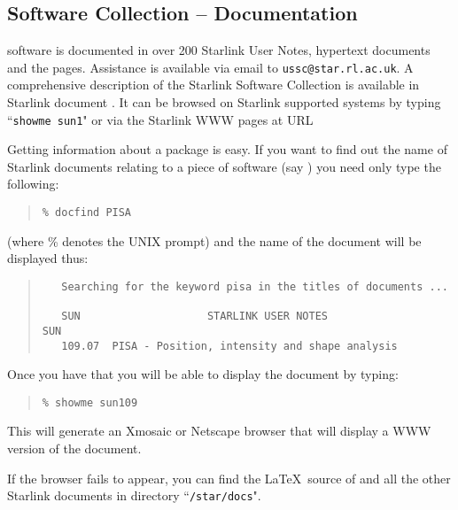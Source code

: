 \subsection{{\STARLINKref} Software Collection -- Documentation} 
\label{sec:ssc}

{\STARLINKref} software is documented in over 200 Starlink User Notes, hypertext
documents and the {\STARLINKWWWref} pages. Assistance is available
via email to {\tt ussc@star.rl.ac.uk}.
A comprehensive description of the Starlink Software 
Collection is available in Starlink document {\SUNONEref}. It can be 
browsed on Starlink supported systems by typing ``{\tt showme sun1}" or via the 
Starlink WWW pages at URL {\HTTPAref}

Getting information about a package is easy. If you want to find out the 
name of Starlink documents relating to a piece of software (say 
{\PISAref}) you need only type the following:

\begin{quote}
\begin{verbatim}
% docfind PISA
\end{verbatim}
\end{quote}

(where \% denotes the UNIX prompt) and the name of the document 
will be displayed thus:

\begin{quote}
\begin{verbatim}
   Searching for the keyword pisa in the titles of documents ...
 
   SUN                    STARLINK USER NOTES                       SUN
   109.07  PISA - Position, intensity and shape analysis
\end{verbatim}
\end{quote}

Once you have that you will be able to display the document by typing:

\begin{quote}
\begin{verbatim}
% showme sun109
\end{verbatim}
\end{quote}

This will generate an Xmosaic or Netscape browser that will display
a WWW version of the document.

If the browser fails to appear, you can find the \LaTeX\ source of {\PISASUNref}
and all the other Starlink documents in directory ``{\tt /star/docs}".

